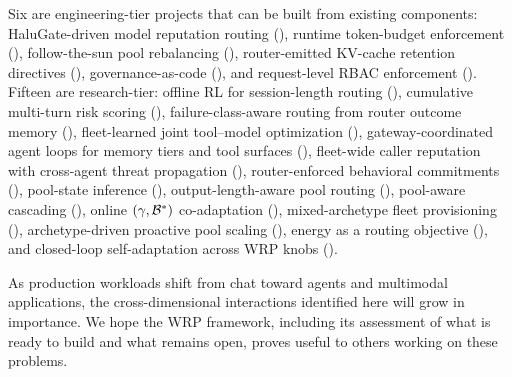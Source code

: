 Six are engineering-tier projects that can be built from existing
components: HaluGate-driven model reputation routing
(), runtime token-budget enforcement
(), follow-the-sun pool rebalancing
(), router-emitted KV-cache retention
directives (), governance-as-code
(), and request-level RBAC enforcement
().  Fifteen are research-tier: offline RL
for session-length routing (), cumulative
multi-turn risk scoring (),
failure-class-aware routing from router outcome memory
(), fleet-learned joint tool--model
optimization (), gateway-coordinated agent
loops for memory tiers and tool surfaces (),
fleet-wide caller reputation with cross-agent threat
propagation (), router-enforced
behavioral commitments (),
pool-state inference
(), output-length-aware pool routing
(), pool-aware cascading
(), online $(\gamma, \mathcal{B}^*)$
co-adaptation (), mixed-archetype fleet
provisioning (), archetype-driven
proactive pool scaling (), energy
as a routing objective (), and closed-loop
self-adaptation across WRP knobs ().

As production workloads shift from chat toward agents and multimodal
applications, the cross-dimensional interactions identified here will grow in
importance.  We hope the WRP framework, including its assessment of
what is ready to build and what remains open, proves useful to
others working on these problems.


